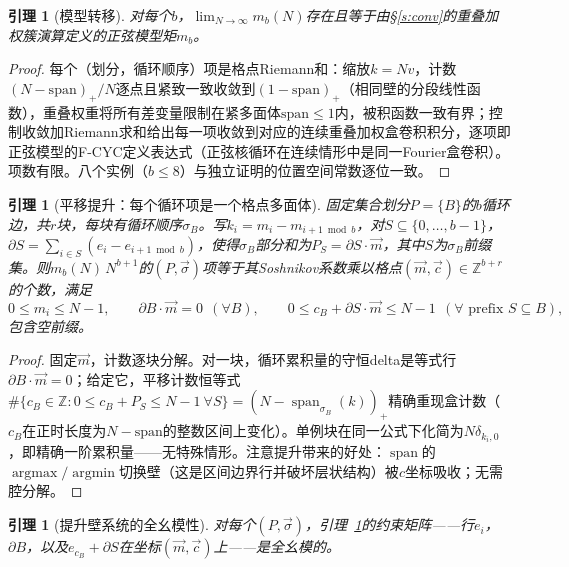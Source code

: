 \documentclass[11pt]{article}
\numberwithin{equation}{section}
\newtheorem{lemma}[theorem]{引理}
\theoremstyle{definition}
\theoremstyle{remark}
\begin{document}
\begin{lemma}[模型转移]\label{l:transfer}
对每个$b$，$\lim_{N\to\infty}m_b(N)$存在且等于由\S\ref{s:conv}的重叠加权簇演算定义的正弦模型矩$m_b$。
\end{lemma}

\begin{proof}
每个（划分，循环顺序）项是格点Riemann和：缩放$k=Nv$，计数$(N-\mathrm{span})_+/N$逐点且紧致一致收敛到$(1-\mathrm{span})_+$（相同壁的分段线性函数），重叠权重将所有差变量限制在紧多面体$\mathrm{span}\le1$内，被积函数一致有界；控制收敛加Riemann求和给出每一项收敛到对应的连续重叠加权盒卷积积分，逐项即正弦模型的F-CYC定义表达式（正弦核循环在连续情形中是同一Fourier盒卷积）。项数有限。八个实例（$b\le8$）与独立证明的位置空间常数逐位一致。
\end{proof}

\begin{lemma}[平移提升：每个循环项是一个格点多面体]\label{l:lift}
固定集合划分$P=\{B\}$的$b$循环边，共$r$块，每块有循环顺序$\sigma_B$。写$k_i=m_i-m_{i+1\bmod b}$，对$S\subseteq\{0,\dots,b-1\}$，$\partial S=\sum_{i\in S}(e_i-e_{i+1\bmod b})$，使得$\sigma_B$部分和为$P_S=\partial S\cdot\vec m$，其中$S$为$\sigma_B$前缀集。则$m_b(N)\,N^{b+1}$的$(P,\vec\sigma)$项等于其Soshnikov系数乘以格点$(\vec m,\vec c)\in\mathbb Z^{b+r}$的个数，满足
\[
0\le m_i\le N-1,\qquad
\partial B\cdot\vec m=0\ \ (\forall B),\qquad
0\le c_B+\partial S\cdot\vec m\le N-1\ \ (\forall\text{ prefix }S\subseteq B),
\]
包含空前缀。
\end{lemma}

\begin{proof}
固定$\vec m$，计数逐块分解。对一块，循环累积量的守恒delta是等式行$\partial B\cdot\vec m=0$；给定它，平移计数恒等式
$\#\{c_B\in\mathbb Z:0\le c_B+P_S\le N-1\ \forall S\}
=(N-\operatorname{span}_{\sigma_B}(k))_+$精确重现盒计数（$c_B$在正时长度为$N-\mathrm{span}$的整数区间上变化）。单例块在同一公式下化简为$N\delta_{k_i,0}$，即精确一阶累积量——无特殊情形。注意提升带来的好处：$\operatorname{span}$的$\operatorname{argmax}/\operatorname{argmin}$切换壁（这是区间边界行并破坏层状结构）被$c$坐标吸收；无需腔分解。
\end{proof}

\begin{lemma}[提升壁系统的全幺模性]\label{l:tu}
对每个$(P,\vec\sigma)$，引理~\ref{l:lift}的约束矩阵——行$e_i$，$\partial B$，以及$e_{c_B}+\partial S$在坐标$(\vec m,\vec c)$上——是全幺模的。
\end{lemma}
\end{document}
